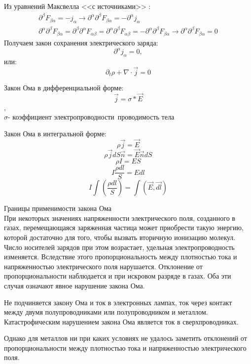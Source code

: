 \documentclass[__main__.tex]{subfiles}
\begin{document}
Из уравнений Максвелла <<с источниками>> :
\begin{gather*}
	\partial^\beta F_{\beta\alpha} = -j_\alpha \longrightarrow \partial^\alpha\partial^\beta F_{\beta\alpha} = -\partial^\alpha j_\alpha\\
	\partial^\alpha\partial^\beta F_{\beta\alpha} = \partial^\beta\partial^\alpha F_{\alpha\beta} = \partial^\alpha\partial^\beta F_{\alpha\beta} = - \partial^\alpha\partial^\beta F_{\beta\alpha} \longrightarrow \partial^\alpha\partial^\beta F_{\beta\alpha} = 0
\end{gather*}
Получаем закон сохранения электрического заряда:
$$\partial^\alpha j_\alpha = 0,$$
или:
$$\partial_t\rho + \nabla \cdot \vec j = 0$$

\begin{definition}
	Закон Ома в дифференциальной форме:
	$$\vec{j}=σ*\vec{E}$$,
	\\$σ$- коэффициент электропроводности\ проводимость тела
\end{definition}
\begin{definition}
	Закон Ома в интегральной форме:
	$$ρ\vec{j}=\vec{E}$$
	$$ρ\vec{j}dS\vec{n}=\vec{E}\vec{n}dS$$
	$$ρI=ES$$
	$$I\frac{ρdl}{S}=Edl$$
	$$I\int(\frac{ρdl}{S})=\int(\vec{E},\vec{dl})$$
\end{definition}
Границы применимости закона Ома\\

При некоторых значениях напряженности электрического поля, созданного в газах, перемещающаяся заряженная частица может приобрести такую энергию, которой достаточно для того, чтобы вызвать вторичную ионизацию молекул. Число носителей зарядов при этом возрастает, удельная электропроводность изменяется. Вследствие этого пропорциональность между плотностью тока и напряженностью электрического поля нарушается. Отклонение от пропорциональности наблюдается и при искровом разряде в газах. Оба эти случая означают явное нарушение закона Ома.

Не подчиняется закону Ома и ток в электронных лампах, ток через контакт между двумя полупроводниками или полупроводником и металлом. Катастрофическим нарушением закона Ома является ток в сверхпроводниках.

Однако для металлов ни при каких условиях не удалось заметить отклонений от пропорциональности между плотностью тока и напряженностью электрического поля.
\end{document}
